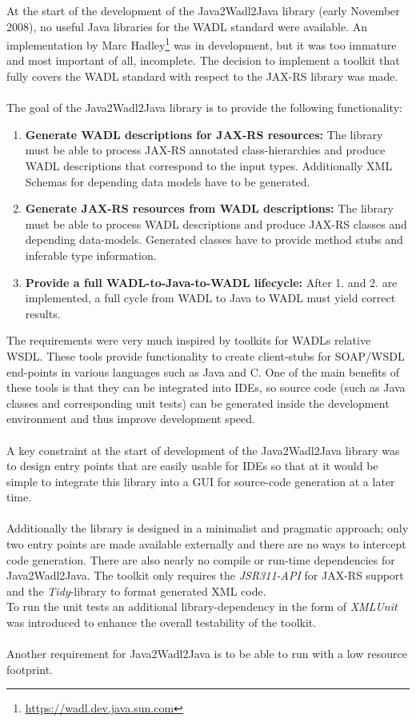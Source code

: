At the start of the development of the Java2Wadl2Java library (early November 2008), no useful Java libraries for the WADL standard were available. An implementation by Marc Hadley\footnote{\url{https://wadl.dev.java.sun.com}} was in development, but it was too immature and most important of all, incomplete. The decision to implement a toolkit that fully covers the WADL standard with respect to the JAX-RS library was made.
\\ \\
The goal of the Java2Wadl2Java library is to provide the following functionality:
\begin{enumerate}
\item{{\bf Generate WADL descriptions for JAX-RS resources:} 
The library must be able to process JAX-RS annotated class-hierarchies and produce WADL descriptions that correspond to the input types. Additionally XML Schemas for depending data models have to be generated.} 
\item{{\bf Generate JAX-RS resources from WADL descriptions:}
The library must be able to process WADL descriptions and produce JAX-RS classes and depending data-models. Generated classes have to provide method stubs and inferable type information.}
\item{{\bf Provide a full WADL-to-Java-to-WADL lifecycle:}
After 1. and 2. are implemented, a full cycle from WADL to Java to WADL must yield correct results.}
\end{enumerate}
The requirements were very much inspired by toolkits for WADLs relative WSDL. These tools provide functionality to create client-stubs for SOAP/WSDL end-points in various languages such as Java and C. One of the main benefits of these tools is that they can be integrated into IDEs, so source code (such as Java classes and corresponding unit tests) can be generated inside the development environment and thus improve development speed.
\\ \\
A key constraint at the start of development of the Java2Wadl2Java library was to design entry points that are easily usable for IDEs so that at it would be simple to integrate this library into a GUI for source-code generation at a later time.
\\ \\
Additionally the library is designed in a minimalist and pragmatic approach; only two entry points are made available externally and there are no ways to intercept code generation. There are also nearly no compile or run-time dependencies for Java2Wadl2Java. The toolkit only requires the \emph{JSR311-API} for JAX-RS support and the \emph{Tidy}-library to format generated XML code.
\\
To run the unit tests an additional library-dependency in the form of \emph{XMLUnit} was introduced to enhance the overall testability of the toolkit.
\\ \\
Another requirement for Java2Wadl2Java is to be able to run with a low resource footprint.